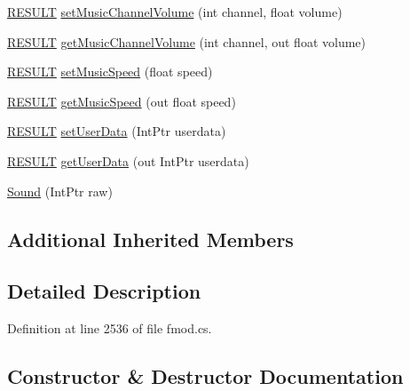 \begin{DoxyCompactItemize}
\item 
\hyperlink{namespace_f_m_o_d_a305d1176ef3f8c8815861a60407ac33d}{R\+E\+S\+U\+LT} \hyperlink{class_f_m_o_d_1_1_sound_a20cc54fcb0b5528c29d33f81e2086132}{set\+Music\+Channel\+Volume} (int channel, float volume)
\item 
\hyperlink{namespace_f_m_o_d_a305d1176ef3f8c8815861a60407ac33d}{R\+E\+S\+U\+LT} \hyperlink{class_f_m_o_d_1_1_sound_ab6f8e4d494d029a7b7149123af9be438}{get\+Music\+Channel\+Volume} (int channel, out float volume)
\item 
\hyperlink{namespace_f_m_o_d_a305d1176ef3f8c8815861a60407ac33d}{R\+E\+S\+U\+LT} \hyperlink{class_f_m_o_d_1_1_sound_a8646bed2b2cb7cb8fcd84398f0abef83}{set\+Music\+Speed} (float speed)
\item 
\hyperlink{namespace_f_m_o_d_a305d1176ef3f8c8815861a60407ac33d}{R\+E\+S\+U\+LT} \hyperlink{class_f_m_o_d_1_1_sound_aa08d130a2df520770aabd0f08871d411}{get\+Music\+Speed} (out float speed)
\item 
\hyperlink{namespace_f_m_o_d_a305d1176ef3f8c8815861a60407ac33d}{R\+E\+S\+U\+LT} \hyperlink{class_f_m_o_d_1_1_sound_af5e4b9df55aac313898fe00f694a1572}{set\+User\+Data} (Int\+Ptr userdata)
\item 
\hyperlink{namespace_f_m_o_d_a305d1176ef3f8c8815861a60407ac33d}{R\+E\+S\+U\+LT} \hyperlink{class_f_m_o_d_1_1_sound_a3a6d3a6d07a5efbce7da1ba759343c59}{get\+User\+Data} (out Int\+Ptr userdata)
\item 
\hyperlink{class_f_m_o_d_1_1_sound_a27eb60c22da1dbb16e8934eacabe095a}{Sound} (Int\+Ptr raw)
\end{DoxyCompactItemize}
\subsection*{Additional Inherited Members}


\subsection{Detailed Description}


Definition at line 2536 of file fmod.\+cs.



\subsection{Constructor \& Destructor Documentation}
\mbox{\label{class_f_m_o_d_1_1_sound_a27eb60c22da1dbb16e8934eacabe095a}} 

